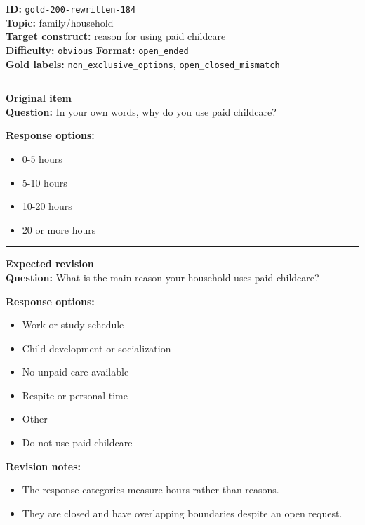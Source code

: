 \documentclass[10pt,a4paper]{article}
\newcommand{\sectionline}{\vspace{0.15em}\hrule\vspace{0.35em}}
\begin{document}
\begin{tcolorbox}[colframe=FlawRed,colback=white,colbacktitle=FlawRed!9,coltitle=black,title={Item 184\hfill Flawed item}]
\textbf{ID:} \texttt{gold-200-rewritten-184}\\
\textbf{Topic:} family/household\\
\textbf{Target construct:} reason for using paid childcare\\
\textbf{Difficulty:} \texttt{obvious} \quad \textbf{Format:} \texttt{open\_ended}\\
\textbf{Gold labels:} \texttt{non\_exclusive\_options}, \texttt{open\_closed\_mismatch}\\
\sectionline
\textbf{Original item}\\
\textbf{Question:} In your own words, why do you use paid childcare?
\par\textbf{Response options:}
\begin{itemize}
\item 0-5 hours
\item 5-10 hours
\item 10-20 hours
\item 20 or more hours
\end{itemize}
\sectionline
\textbf{Expected revision}\\
\textbf{Question:} What is the main reason your household uses paid childcare?
\par\textbf{Response options:}
\begin{itemize}
\item Work or study schedule
\item Child development or socialization
\item No unpaid care available
\item Respite or personal time
\item Other
\item Do not use paid childcare
\end{itemize}
\par\textbf{Revision notes:}
\begin{itemize}
\item The response categories measure hours rather than reasons.
\item They are closed and have overlapping boundaries despite an open request.
\end{itemize}
\end{tcolorbox}
\end{document}
